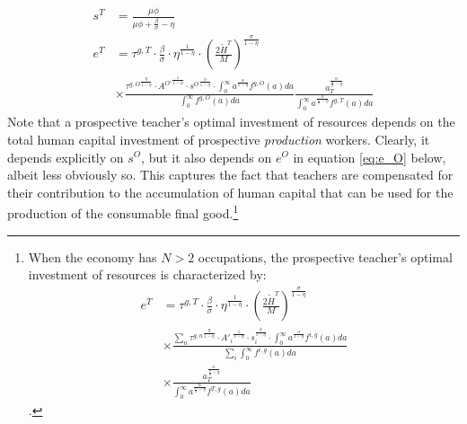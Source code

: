 \documentclass[onehalfspacing,11pt]{article}
\begin{document}
\begin{align}
s^{T} & = \frac{\mu \phi}{\mu \phi+\tfrac{\beta}{\sigma}-\eta} \\
e^{T} & = \tau^{g,T}\cdot\tfrac{\beta}{\sigma}\cdot\eta^{\frac{1}{1-\eta}}\cdot \left(\tfrac{2\widetilde{H}^T}{M}\right)^{\frac{\sigma}{1-\eta}} \nonumber\\
& \times \frac{{\tau^{g,O}}^{\frac{\eta}{1-\eta}} \cdot {A^{O'}}^{\frac{1}{1-\eta}} \cdot {s^O}^{\frac{\phi}{1-\eta}} \cdot \int_0^\infty a^{\frac{\alpha}{1-\eta}} f^{g,O}(a)da }{\int_0^\infty f^{g,O}(a)da}  \frac{a_T^{\frac{\alpha}{\frac{\sigma}{\beta}-\eta}}}{\int_0^\infty a^{\frac{\alpha}{\frac{\sigma}{\beta}-\eta}} f^{g,T}(a)da}
\end{align}
Note that a prospective teacher's optimal investment of resources depends on the total human capital investment of prospective {\it production} workers. Clearly, it depends explicitly on $s^O$, but it also depends on $e^O$ in equation \eqref{eq:e_O} below, albeit less obviously so. This captures the fact that teachers are compensated for their contribution to the accumulation of human capital that can be used for the production of the consumable final good.\footnote{When the economy has $N>2$ occupations, the prospective teacher's optimal investment of resources is characterized by:
\begin{align*}
e^{T} & = \tau^{g,T}\cdot\tfrac{\beta}{\sigma}\cdot\eta^{\frac{1}{1-\eta}}\cdot \left(\tfrac{2\widetilde{H}^T}{M}\right)^{\frac{\sigma}{1-\eta}} \nonumber\\
& \times \frac{\sum_n {\tau^{g,n}}^{\frac{\eta}{1-\eta}} \cdot {A'_i}^{\frac{1}{1-\eta}} \cdot s_i^{\frac{\phi}{1-\eta}} \cdot \int_0^\infty a^{\frac{\alpha}{1-\eta}} f^{i,g}(a)da }{\sum_i \int_0^\infty f^{i,g}(a)da} \nonumber\\
& \times \frac{a_T^{\frac{\alpha}{\frac{\sigma}{\beta}-\eta}}}{\int_0^\infty a^{\frac{\alpha}{\frac{\sigma}{\beta}-\eta}} f^{T,g}(a)da}
\end{align*}.
}
\end{document}
